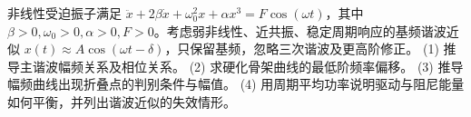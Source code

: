 非线性受迫振子满足 \(\ddot x+2\beta\dot x+\omega_0^2x+\alpha x^3=F\cos(\omega t)\)，其中 \(\beta>0,\omega_0>0,\alpha>0,F>0\)。考虑弱非线性、近共振、稳定周期响应的基频谐波近似 \(x(t)\approx A\cos(\omega t-\delta)\)，只保留基频，忽略三次谐波及更高阶修正。
(1) 推导主谐波幅频关系及相位关系。
(2) 求硬化骨架曲线的最低阶频率偏移。
(3) 推导幅频曲线出现折叠点的判别条件与幅值。
(4) 用周期平均功率说明驱动与阻尼能量如何平衡，并列出谐波近似的失效情形。
